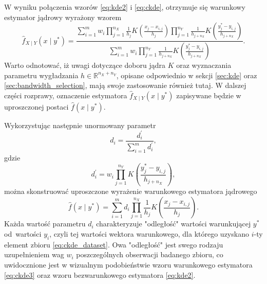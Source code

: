 \documentclass[12pt,a4paper,oneside]{book}
\theoremstyle{definition}
\begin{document}
W wyniku połączenia wzorów \eqref{eq:kde2} i \eqref{eq:ckde}, otrzymuje się warunkowy estymator jądrowy wyrażony wzorem
\begin{equation} \label{eq:ckde2}
\hat{f}_{X \mid Y}(x \mid y^*) = \frac{\sum_{i=1}^m w_i \prod_{j=1}^{n_X} \frac{1}{h_j} K \left( \frac{x_j-x_{i,j}}{h_j} \right) \prod_{j=1}^{n_Y} \frac{1}{h_{j+n_X}} K \left( \frac{y^*_j-y_{i,j}}{h_{j+n_X}} \right)}
{\sum_{i=1}^m w_i \prod_{j=1}^{n_Y} \frac{1}{h_{j+n_X}} K \left( \frac{y^*_j-y_{i,j}}{h_{j+n_X}} \right)}.
\end{equation}
Warto odnotować, iż uwagi dotyczące doboru jądra $K$ oraz wyznaczania parametru wygładzania $h \in \mathbb{R}^{n_X+n_Y}$, opisane odpowiednio w sekcji \ref{sec:kde} oraz \ref{sec:bandwidth_selection}, mają swoje zastosowanie również tutaj.
W dalszej części rozprawy, oznaczenie estymatora $\hat{f}_{X \mid Y}(x \mid y^*)$ zapisywane będzie w uproszczonej postaci $\hat{f}(x \mid y^*)$.

Wykorzystując następnie unormowany parametr
\begin{equation} \label{eq:d}
d_i = \frac{d_i^\prime}{\sum_{i=1}^m d_i^\prime},
\end{equation}
gdzie
\begin{equation} \label{eq:d_prim}
d_i^\prime = w_i \prod_{j=1}^{n_Y} K \left( \frac{y^*_j-y_{i,j}}{h_{j+n_X}} \right),
\end{equation}
można skonstruować uproszczone wyrażenie warunkowego estymatora jądrowego
\begin{equation} \label{eq:ckde3}
\hat{f}(x \mid y^*) = \sum_{i=1}^m d_i \prod_{j=1}^{n_X} \frac{1}{h_j} K \left( \frac{x_j-x_{i,j}}{h_j} \right).
\end{equation}
Każda wartość parametru $d_i$ charakteryzuje "odległość" wartości warunkującej $y^*$ od~wartości $y_i$, czyli tej wartości wektora warunkowego, dla którego uzyskano $i$-ty element zbioru \eqref{eq:ckde_dataset}. Owa "odległość" jest swego rodzaju uzupełnieniem wag $w_i$ poszczególnych obserwacji badanego zbioru, co uwidocznione jest w wizualnym podobieństwie wzoru warunkowego estymatora \eqref{eq:ckde3} oraz wzoru bezwarunkowego estymatora \eqref{eq:kde2}.
\end{document}
